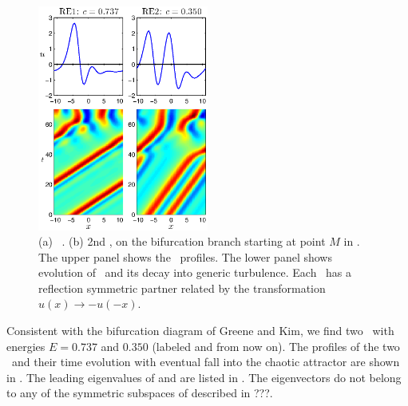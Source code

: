 {%
\begin{figure}[t] \label{f:ks22RE}
\begin{center}
\includegraphics[width=0.5\textwidth]{figs/ks22_RE1-2.eps}
\end{center}
\caption{
(a)
    \Reqv\ .
(b)
2nd , on the bifurcation branch starting
at point $M$ in .
The upper panel shows
the \reqva\ profiles. The lower panel shows evolution
of \reqva\
and its decay into generic turbulence.
Each \reqv\ has a reflection symmetric partner related by the
transformation $u(x) \to -u(-x)$.
}
\end{figure}


Consistent with the bifurcation diagram of Greene and Kim,
we find two \reqva\ with energies $E = 0.737$ and $0.350$
(labeled  and  from now on).
The profiles of the two \reqva\ and their time evolution
with eventual fall into the chaotic attractor are
shown in .  The leading eigenvalues of
 and  are listed in .  
The eigenvectors
do not belong to any of the symmetric subspaces of {\KSe}
described in ???.

}
